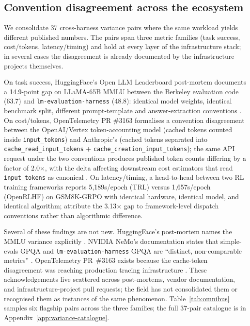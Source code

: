 \documentclass{article}
\begin{document}
\subsection{Convention disagreement across the ecosystem}
\label{sec:problem:variance}

We consolidate 37 cross-harness variance pairs where the same
workload yields different published numbers. The pairs span
three metric families (task success, cost/tokens,
latency/timing) and hold at every layer of the infrastructure
stack; in several cases the disagreement is already documented
by the infrastructure projects themselves.

On task success, HuggingFace's Open LLM Leaderboard post-mortem
documents a 14.9-point gap on LLaMA-65B MMLU between the
Berkeley evaluation code (63.7) and \texttt{lm-evaluation-harness}
(48.8): identical model weights, identical benchmark split,
different prompt-template and answer-extraction conventions
\citep{beeching2023openllm}.
On cost/tokens, OpenTelemetry PR \#3163 formalises a convention
disagreement between the OpenAI/Vertex token-accounting model
(cached tokens counted inside \texttt{input\_tokens}) and
Anthropic's (cached tokens separated into
\texttt{cache\_read\_input\_tokens} +
\texttt{cache\_creation\_input\_tokens}); the same API request
under the two conventions produces published token counts
differing by a factor of 2.0$\times$, with the delta affecting
downstream cost estimators that read \texttt{input\_tokens} as
canonical \citep{opentelemetry3163}. On latency/timing, a
head-to-head between two RL training frameworks reports
5{,}189s/epoch (TRL) versus 1{,}657s/epoch (OpenRLHF) on
GSM8K-GRPO with identical hardware, identical model, and
identical algorithm; \citet[Table 4]{hu2025openrlhf} attribute
the 3.13$\times$ gap to framework-level dispatch conventions
rather than algorithmic difference.

Several of these findings are not new. HuggingFace's
post-mortem names the MMLU variance explicitly
\citep{beeching2023openllm}. NVIDIA NeMo's documentation states
that simple-evals GPQA and \texttt{lm-evaluation-harness} GPQA
are ``distinct, non-comparable metrics'' \citep{nvidiaNemoGPQA}.
OpenTelemetry PR~\#3163 exists because the cache-token
disagreement was reaching production tracing infrastructure
\citep{opentelemetry3163}. These acknowledgements live
scattered across post-mortems, vendor documentation, and
infrastructure-project pull requests; the field has not
consolidated them or recognised them as instances of the same
phenomenon. Table~\ref{tab:omnibus} samples six flagship pairs
across the three families; the full 37-pair catalogue is in
Appendix~\ref{app:variance-catalogue}.
\end{document}

